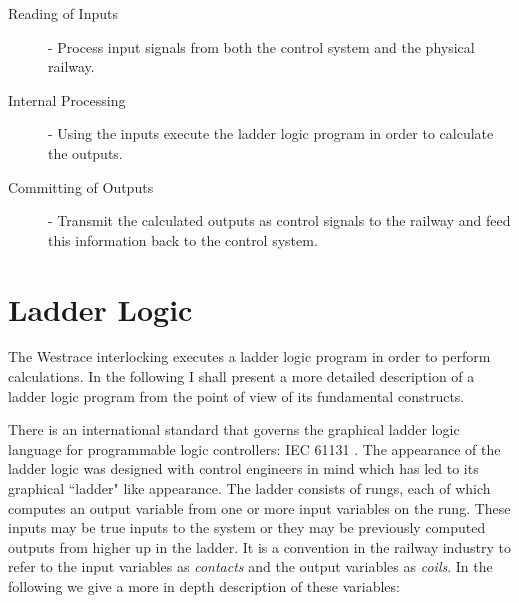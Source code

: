 \begin{description}

\item[Reading of Inputs] - Process input signals from both the control system and the physical railway.

\item[Internal Processing] - Using the inputs execute the ladder logic program in order to calculate the outputs. 

\item[Committing of Outputs] - Transmit the calculated outputs as control signals to the railway and feed this information back to the control system.

\end{description}




\section{Ladder Logic}

The Westrace interlocking executes a ladder logic program \cite{IEC03} in order to perform calculations. In the following I shall present a more detailed description of a ladder logic program from the point of view of its fundamental constructs.  

\begin{comment}
The Westrace Interlocking performs calculations by executing a ladder logic
program \cite{IEC03}. In the following we will look in more detail at these
ladder logic programs. The main concepts behind their construction and
behaviour will be presented. In later chapters we will provide a formal framework
for the verification of these programs.
\end{comment}

There is an international standard that governs the graphical  ladder logic language for programmable logic controllers: IEC 61131 \cite{IEC03}. The appearance of the ladder logic was designed with control engineers in mind which has led to its graphical ``ladder" like appearance. The ladder consists of rungs, each of which computes an output variable from one or more input variables on the rung. These inputs may be true inputs to the system or they may be previously computed outputs from higher up in the ladder.  It is a convention in the railway industry to refer to the input variables as \emph{contacts} and the output variables as \emph{coils}. In the following we give a more in depth description of these variables:

